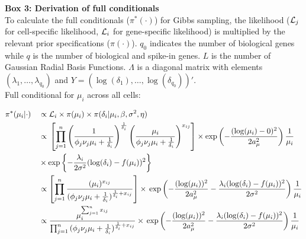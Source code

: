 \begin{Comment}
\textbf{Box 3: Derivation of full conditionals}\\
To calculate the full conditionals ($\pi^*(\cdot)$) for Gibbs sampling, the likelihood ($\mathcal{L}_j$ for cell-specific likelihood, $\mathcal{L}_i$ for gene-specific likelihood) is multiplied by the relevant prior specifications ($\pi(\cdot)$). $q_0$ indicates the number of biological genes while $q$ is the number of biological and spike-in genes. $L$ is the number of Gaussian Radial Basis Functions. $\Lambda$ is a diagonal matrix with elements $(\lambda_1, \ldots, \lambda_{q_0})$ and $Y = (\log(\delta_1), \ldots, \log(\delta_{q_0}))'$.\\ 

Full conditional for $\mu_i$ across all cells:
\begin{fleqn}
\begin{align*}
&\pi^*(\mu_i|\cdot)&&\propto{} \mathcal{L}_i\times\pi(\mu_i)\times\pi(\delta_i|\mu_i,\beta,\sigma^2,\eta)\\
& &&\propto{}\left[\prod_{j=1}^n\left(\frac{1}{\phi_j\nu_j\mu_i+\frac{1}{\delta_i}}\right)^\frac{1}{\delta_i}\left(\frac{\mu_i}{\phi_j\nu_j\mu_i+\frac{1}{\delta_i}}\right)^{x_{ij}}\right]\times\exp\left(-\frac{(\log(\mu_i)-0)^2}{2a_\mu^2}\right)\frac{1}{\mu_i}\\
& &&\times\exp\left\lbrace-\frac{\lambda_i}{2\sigma^2}(\log(\delta_i)-f(\mu_i))^2\right\rbrace\\
& &&\propto\left[\prod_{j=1}^n{}\frac{(\mu_i)^{x_{ij}}}{(\phi_j\nu_j\mu_i+\frac{1}{\delta_i})^{\frac{1}{\delta_i}+x_{ij}}}\right]\times{}\exp\left(-\frac{(\log(\mu_i))^2}{2a_\mu^2}-\frac{\lambda_i(\log(\delta_i)-f(\mu_i))^2}{2\sigma^2}\right)\frac{1}{\mu_i}\\
& &&\propto{}\frac{\mu_i^{\sum_{j=1}^n{}x_{ij}}}{\prod_{j=1}^n{}(\phi_j\nu_j\mu_i+\frac{1}{\delta_i})^{\frac{1}{\delta_i}+x_{ij}}}\times{}\exp\left(-\frac{(\log(\mu_i))^2}{2a_\mu^2}-\frac{\lambda_i(\log(\delta_i)-f(\mu_i))^2}{2\sigma^2}\right)\frac{1}{\mu_i}
\end{align*}
\end{fleqn}


\end{Comment}
